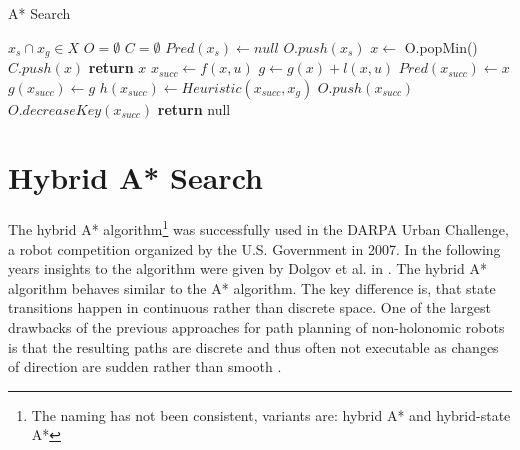 \begin{algorithm}
    \caption{A* Search}\label{alg:A*}
    \begin{algorithmic}[1]
        \Require $x_s \cap x_g \in X$
        \State $O = \emptyset$
        \State $C = \emptyset$
        \State $Pred(x_s) \gets null$
        \State $O.push(x_s)$
            \State $x \gets$ O.popMin()
            \State $C.push(x)$
                \State \textbf{return} $x$
            \Else
                \State $x_{succ} \gets f(x,u)$
                        \State $g \gets g(x) + l(x,u)$
                            \State $Pred(x_{succ}) \gets x$
                            \State $g(x_{succ}) \gets g$
                            \State $h(x_{succ}) \gets Heuristic(x_{succ}, x_g)$ \label{alg:A*Heuristic}
                                \State $O.push(x_{succ})$
                            \Else
                                \State $O.decreaseKey(x_{succ})$
                            \EndIf
                        \EndIf
                    \EndIf
                \EndFor
            \EndIf
        \EndWhile
        \State \textbf{return} null
    \end{algorithmic}
\end{algorithm}

\newpage
\section{Hybrid A* Search}\label{sec:HA}
The hybrid A* algorithm\footnote{The naming has not been consistent, variants are: hybrid A* and hybrid-state A*} was successfully used in the DARPA Urban Challenge, a robot competition organized by the U.S. Government in 2007. In the following years insights to the algorithm were given by Dolgov et al. in \cite{Montemerlo.2008,Dolgov.2008,Dolgov.2009,Dolgov.2010}. The hybrid A* algorithm behaves similar to the A* algorithm. The key difference is, that state transitions happen in continuous rather than discrete space. One of the largest drawbacks of the previous approaches for path planning of non-holonomic robots is that the resulting paths are discrete and thus often not executable as changes of direction are sudden rather than smooth \cite{Montemerlo.2008,Dolgov.2010}.


